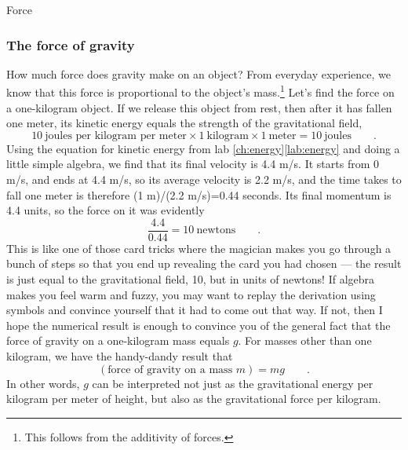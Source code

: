 \begin{envsubsection}{Force}
\subsubsection{The force of gravity}
How much force does gravity make on an object? From everyday experience, we know
that this force is proportional to the object's mass.\footnote{This follows from the
additivity of forces.} Let's find the force on
a one-kilogram object. If we release this object from rest, then after it has
fallen one meter, its kinetic energy equals the strength of the gravitational field,
\begin{equation*}
10\ \text{joules per kilogram per meter}\times1\ \text{kilogram}\times1\ \text{meter} = 10\ \text{joules} \qquad .
\end{equation*}
Using the equation for kinetic energy from lab \ref{ch:energy}\ref{lab:energy} and doing a little simple algebra, we find that
its final velocity is 4.4 m/s. It starts from 0 m/s, and ends at 4.4 m/s, so
its average velocity is 2.2 m/s, and the time takes to fall one meter is therefore
(1 m)/(2.2 m/s)=0.44 seconds. Its final momentum is 4.4 units, so the force on it was
evidently
\begin{equation*}
	\frac{4.4}{0.44} = 10\ \text{newtons} \qquad .
\end{equation*}
This is like one of those card tricks where the magician makes you go through a bunch
of steps so that you end up revealing the card you had chosen --- the result is just
equal to the gravitational field, 10, but in units of newtons! If algebra makes you feel
warm and fuzzy, you may want to replay the derivation using symbols and convince yourself
that it had to come out that way. If not, then I hope the numerical result is enough
to convince you of the general fact that the force of gravity on a one-kilogram mass
equals $g$. For masses other than one kilogram, we have the handy-dandy result that
\begin{equation*}
	(\text{force of gravity on a mass $m$}) = mg \qquad .
\end{equation*}
In other words, $g$ can be interpreted not just as the gravitational energy per kilogram
per meter of height, but also as the gravitational force per kilogram.
\end{envsubsection}
%
